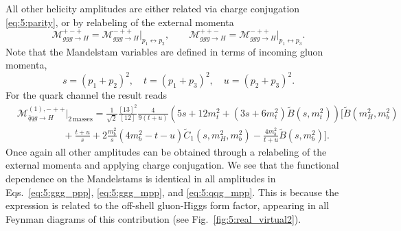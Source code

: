 All other helicity amplitudes are either related via charge conjugation \eqref{eq:5:parity}, or by relabeling of the external momenta
\begin{equation}
\mathcal{M}_{ggg \rightarrow H}^{+-+} = \mathcal{M}_{ggg \rightarrow H}^{-++} \bigg \vert_{p_1 \leftrightarrow p_2}, \qquad \mathcal{M}_{ggg \rightarrow H}^{++-} = \mathcal{M}_{ggg \rightarrow H}^{-++} \bigg \vert_{p_1 \leftrightarrow p_3}.
\label{eq:5:momentum_exchange}
\end{equation}
Note that the Mandelstam variables are defined in terms of incoming gluon momenta, \ie\
\begin{equation}
s = (p_1 + p_2)^2, \quad t = (p_1 + p_3)^2, \quad u = (p_2 + p_3)^2.
\end{equation}
For the quark channel the result reads
\begin{equation}
\begin{split}
&\mathcal{M}_{\bar{q}q g \rightarrow H}^{(1),-++} \bigg \vert_{2\, \text{masses}} =  \frac{1}{\sqrt{2}} \frac{[13]^2}{[12]}  \frac{4 }{9 (t + u)} \left(5 s + 12 m_t^2 + (3 s + 6 m_t^2) \tilde{B}\!(s, m_t^2) \right)\bigg [\tilde{B}\!(m_H^2, m_b^2) \\
& \hspace{2cm}  + \frac{t + u}{s} + 2 \frac{m_b^2}{s} \left(4m_b^2 - t - u  \right) \tilde{C}_1\!(s, m_H^2, m_b^2) - \frac{4 m_b^2}{t + u}\tilde{B}\!(s, m_b^2) \bigg ].
\label{eq:5:qqg_mpp}
\end{split}
\end{equation}
Once again all other amplitudes can be obtained through a relabeling of the external momenta and applying charge conjugation. We see that the functional dependence on the Mandelstams is identical in all amplitudes in Eqs.~\eqref{eq:5:ggg_ppp}, \eqref{eq:5:ggg_mpp}, and \eqref{eq:5:qqg_mpp}. This is because the expression is related to the off-shell gluon-Higgs form factor, appearing in all Feynman diagrams of this contribution (see Fig.~\ref{fig:5:real_virtual2}).

